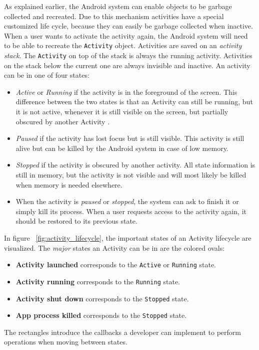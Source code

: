 As explained earlier, the Android system can enable objects to be garbage collected and recreated. Due to this mechanism activities have a special customized life cycle, because they can easily be garbage collected when inactive. When a user wants to activate the activity again, the Android system will need to be able to recreate the \texttt{Activity} object. Activities are saved on an \textit{activity stack}. The \texttt{Activity} on top of the stack is always the running activity. Activities on the stack below the current one are always invisible and inactive. An activity can be in one of four states:
\begin{itemize}
\item{\textit{Active} or \textit{Running} if the activity is in the foreground of the screen. This difference between the two states is that an Activity can still be running, but it is not active, whenever it is still visible on the screen, but partially obscured by another Activity \cite{AndroidStates}.}
\item{\textit{Paused} if the activity has lost focus but is still visible. This activity is still alive but can be killed by the Android system in case of low memory.}
\item{\textit{Stopped} if the activity is obscured by another activity. All state information is still in memory, but the activity is not visible and will most likely be killed when memory is needed elsewhere.}
\item{When the activity is \textit{paused} or \textit{stopped}, the system can ask to finish it or simply kill its process. When a user requests access to the activity again, it should be restored to its previous state.}
\end{itemize}
In figure ~\ref{fig:activity_lifecycle}, the important states of an Activity lifecycle are visualized. The \textit{major} states an Activity can be in are the colored ovals:
\begin{itemize}
\item{\textbf{Activity launched} corresponds to the \texttt{Active} or \texttt{Running} state.}
\item{\textbf{Activity running} corresponds to the \texttt{Running} state.}
\item{\textbf{Activity shut down} corresponds to the \texttt{Stopped} state.}
\item{\textbf{App process killed} corresponds to the \texttt{Stopped} state.}
\end{itemize}
The rectangles introduce the callbacks a developer can implement to perform operations when moving between states.
